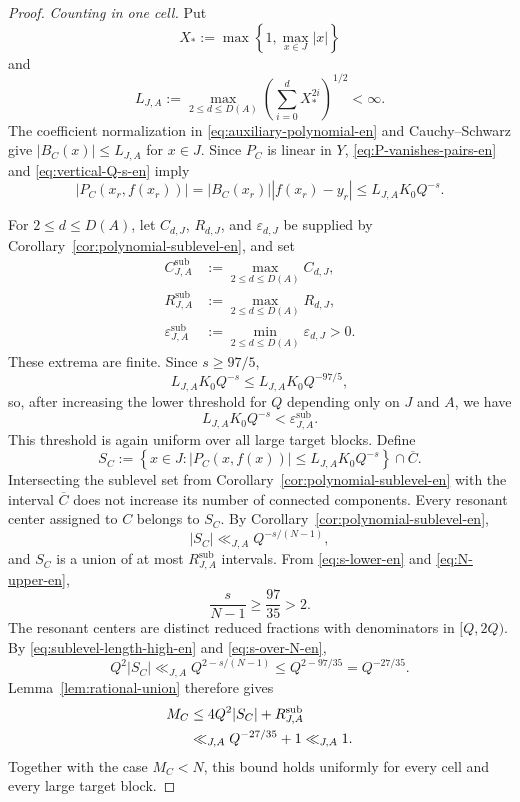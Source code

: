\documentclass[11pt]{amsart}
\numberwithin{equation}{section}
\theoremstyle{definition}
\theoremstyle{remark}
\newcommand{\abs}[1]{\left\lvert #1\right\rvert}
\newcommand{\set}[1]{\left\{#1\right\}}
\newcommand{\eps}{\varepsilon}
\begin{document}
\begin{proof}
\emph{Counting in one cell.} Put
\[
X_*:=\max\set{1,\max_{x\in J}|x|}
\]
and
\begin{equation}\label{eq:L-A-en}
L_{J,A}
:=
\max_{2\leq d\leq D(A)}
\left(\sum_{i=0}^dX_*^{2i}\right)^{1/2}<\infty.
\end{equation}
The coefficient normalization in
\eqref{eq:auxiliary-polynomial-en} and Cauchy--Schwarz give
$|B_C(x)|\leq L_{J,A}$ for $x\in J$. Since $P_C$ is linear in $Y$,
\eqref{eq:P-vanishes-pairs-en} and
\eqref{eq:vertical-Q-s-en} imply
\begin{equation}\label{eq:P-small-graph-en}
\abs{P_C(x_r,f(x_r))}
=
|B_C(x_r)|\abs{f(x_r)-y_r}
\leq
L_{J,A}K_0Q^{-s}.
\end{equation}

For $2\leq d\leq D(A)$, let
$C_{d,J}$, $R_{d,J}$, and $\eps_{d,J}$ be supplied by
Corollary~\ref{cor:polynomial-sublevel-en}, and set
\begin{equation}\label{eq:uniform-sublevel-data-en}
\begin{aligned}
C_{J,A}^{\mathrm{sub}}
&:=\max_{2\leq d\leq D(A)}C_{d,J},\\
R_{J,A}^{\mathrm{sub}}
&:=\max_{2\leq d\leq D(A)}R_{d,J},\\
\eps_{J,A}^{\mathrm{sub}}
&:=\min_{2\leq d\leq D(A)}\eps_{d,J}>0.
\end{aligned}
\end{equation}
These extrema are finite. Since $s\geq97/5$,
\[
L_{J,A}K_0Q^{-s}\leq L_{J,A}K_0Q^{-97/5},
\]
so, after increasing the lower threshold for $Q$ depending only on
$J$ and $A$, we have
\begin{equation}\label{eq:sublevel-smallness-en}
L_{J,A}K_0Q^{-s}<\eps_{J,A}^{\mathrm{sub}}.
\end{equation}
This threshold is again uniform over all large target blocks.
Define
\[
S_C
:=
\set{x\in J:
\abs{P_C(x,f(x))}\leq L_{J,A}K_0Q^{-s}}
\cap\overline C.
\]
Intersecting the sublevel set from
Corollary~\ref{cor:polynomial-sublevel-en} with the interval
$\overline C$ does not increase its number of connected components.
Every resonant center assigned to $C$ belongs to $S_C$. By
Corollary~\ref{cor:polynomial-sublevel-en},
\begin{equation}\label{eq:sublevel-length-high-en}
|S_C|\ll_{J,A}Q^{-s/(N-1)},
\end{equation}
and $S_C$ is a union of at most
$R_{J,A}^{\mathrm{sub}}$ intervals. From
\eqref{eq:s-lower-en} and \eqref{eq:N-upper-en},
\begin{equation}\label{eq:s-over-N-en}
\frac{s}{N-1}\geq\frac{97}{35}>2.
\end{equation}
The resonant centers are distinct reduced fractions with denominators
in $[Q,2Q)$. By \eqref{eq:sublevel-length-high-en} and
\eqref{eq:s-over-N-en},
\[
Q^2|S_C|
\ll_{J,A}
Q^{2-s/(N-1)}
\leq Q^{2-97/35}
=Q^{-27/35}.
\]
Lemma~\ref{lem:rational-union} therefore gives
\begin{align}
M_C
&\leq4Q^2|S_C|+R_{J,A}^{\mathrm{sub}}\notag\\
&\ll_{J,A}Q^{-27/35}+1
\ll_{J,A}1.
\label{eq:centers-per-cell-en}
\end{align}
Together with the case $M_C<N$, this bound holds uniformly for every
cell and every large target block.


\end{proof}
\end{document}
